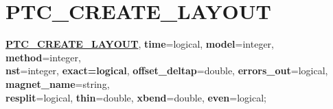 \section{PTC\_CREATE\_LAYOUT}
\begin{description}

   \item \textbf{\href{PTC_CREATE_LAYOUT}{PTC\_CREATE\_LAYOUT}},
     \textbf{ time}=logical,\textbf{ model}=integer,
     \textbf{method}=integer, \\
     \textbf{ nst}=integer, \textbf{exact=logical},
     \textbf{offset\_deltap}=double, \textbf{errors\_out}=logical,
     \textbf{magnet\_name}=string, \\ 
     \textbf{resplit}=logical, \textbf{thin}=double,
     \textbf{xbend}=double, \textbf{even}=logical; 
	
\end{description}

